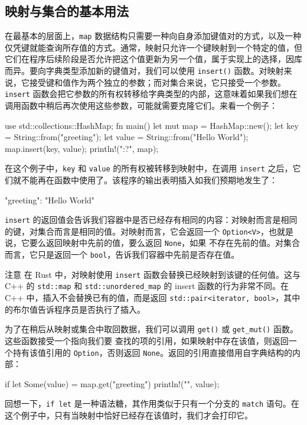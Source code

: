 \subsection{映射与集合的基本用法}
\label{idx:idx_39e83dd7}
在最基本的层面上，\texttt{map} 数据结构只需要一种向自身添加键值对的方式，以及一种仅凭键就能查询所存值的方式。通常，映射只允许一个键映射到一个特定的值，但它们在程序后续阶段是否允许把这个值更新为另一个值，属于实现上的选择，因库而异。要向字典类型添加新的键值对，我们可以使用 \texttt{insert()} 函数。对映射来说，它接受键和值作为两个独立的参数；而对集合来说，它只接受一个参数。\texttt{insert} 函数会把它参数的所有权转移给字典类型的内部，这意味着如果我们想在调用函数中稍后再次使用这些参数，可能就需要克隆它们。来看一个例子：
\begin{codebox}[rust]
use std::collections::HashMap;
fn main() {
    let mut map = HashMap::new();
    let key = String::from("greeting");
    let value = String::from("Hello World");
    map.insert(key, value);
    println!("{:?}", map);
}
\end{codebox}
在这个例子中，\texttt{key} 和 \texttt{value} 的所有权被转移到映射中，在调用 \texttt{insert} 之后，它们就不能再在函数中使用了。该程序的输出表明插入如我们预期地发生了：
\begin{codeboxdark}
{"greeting": "Hello World"}
\end{codeboxdark}
\texttt{insert} 的返回值会告诉我们容器中是否已经存有相同的内容：对映射而言是相同的键，对集合而言是相同的值。对映射而言，它会返回一个
\texttt{Option<V>}，也就是说，它要么返回映射中先前的值，要么返回 \texttt{None}，如果
不存在先前的值。对集合而言，它只是返回一个 \texttt{bool}，告诉我们容器中先前是否存在值。
\begin{myNotic}{注意}
在 Rust 中，对映射使用 \texttt{insert} 函数会替换已经映射到该键的任何值。这与 C++ 的 \texttt{std::map} 和 \texttt{std::\allowbreak{}unordered\_\allowbreak{}map} 的 insert 函数的行为非常不同。在 C++ 中，插入不会替换已有的值，而是返回 \texttt{std::\allowbreak{}pair<\allowbreak{}iterator,\allowbreak{} bool>\allowbreak{}}，其中的布尔值告诉程序员是否执行了插入。
\end{myNotic}
\label{idx:idx_524cf21a}
为了在稍后从映射或集合中取回数据，我们可以调用 \texttt{get()} 或
\texttt{get\_mut()} 函数。这些函数接受一个指向我们要
查找的项的引用，如果映射中存在该值，则返回一个持有该值引用的 \texttt{Option}，否则返回 \texttt{None}。返回的引用直接借用自字典结构的内部：
\begin{codebox}[rust]
if let Some(value) = map.get("greeting") {
    println!("{}", value);
}
\end{codebox}
回想一下，\texttt{if let} 是一种语法糖，其作用类似于只有一个分支的 \texttt{match} 语句。在这个例子中，只有当映射中恰好已经存在该值时，我们才会打印它。
